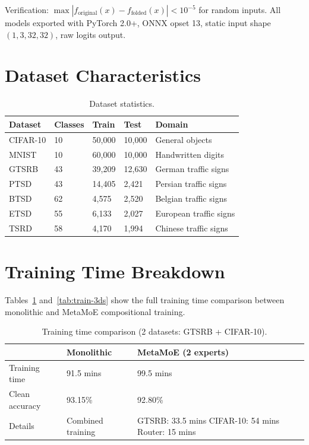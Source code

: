 \documentclass[runningheads]{llncs}
\begin{document}
Verification: $\max|f_{\text{original}}(x) - f_{\text{folded}}(x)| < 10^{-5}$ for random inputs. All models exported with PyTorch 2.0+, ONNX opset 13, static input shape $(1, 3, 32, 32)$, raw logits output.

\section{Dataset Characteristics}
\label{app:datasets}

\begin{table}[H]
\centering
\caption{Dataset statistics.}
\small
\begin{tabular}{lllll}
\toprule
\textbf{Dataset} & \textbf{Classes} & \textbf{Train} & \textbf{Test} & \textbf{Domain} \\
\midrule
CIFAR-10 & 10 & 50,000 & 10,000 & General objects \\
MNIST & 10 & 60,000 & 10,000 & Handwritten digits \\
GTSRB & 43 & 39,209 & 12,630 & German traffic signs \\
PTSD & 43 & 14,405 & 2,421 & Persian traffic signs \\
BTSD & 62 & 4,575 & 2,520 & Belgian traffic signs \\
ETSD & 55 & 6,133 & 2,027 & European traffic signs \\
TSRD & 58 & 4,170 & 1,994 & Chinese traffic signs \\
\bottomrule
\end{tabular}
\end{table}

\section{Training Time Breakdown}
\label{app:training-time}

Tables~\ref{tab:train-2ds} and~\ref{tab:train-3ds} show the full training time comparison between monolithic and \textsf{MetaMoE} compositional training.

\begin{table}[H]
\centering
\caption{Training time comparison (2 datasets: GTSRB + CIFAR-10).}
\label{tab:train-2ds}
\small
\begin{tabular}{@{}llp{4.2cm}@{}}
\toprule
 & \textbf{Monolithic} & \textbf{\textsf{MetaMoE} (2 experts)} \\
\midrule
Training time & 91.5 mins & 99.5 mins \\
Clean accuracy & 93.15\% & 92.80\% \\
Details & Combined training & GTSRB: 33.5 mins \newline CIFAR-10: 54 mins \newline Router: 15 mins \\
\bottomrule
\end{tabular}
\end{table}
\end{document}
